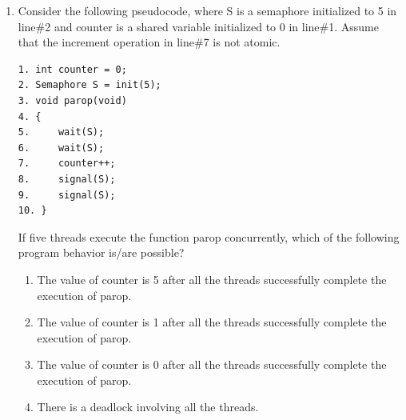 \documentclass[a4paper, 11pt]{article}
\begin{document}
\begin{enumerate}
    \item Consider the following pseudocode, where S is a semaphore initialized to 5 in line\#2 and counter is a shared variable initialized to 0 in line\#1. Assume that the increment operation in line\#7 is not atomic.
    
    \begin{verbatim}
1. int counter = 0;
2. Semaphore S = init(5);
3. void parop(void)
4. {
5.     wait(S);
6.     wait(S);
7.     counter++;
8.     signal(S);
9.     signal(S);
10. }
    \end{verbatim}
    
    If five threads execute the function parop concurrently, which of the following program behavior is/are possible?
    \begin{enumerate}
        \item The value of counter is 5 after all the threads successfully complete the execution of parop.
        \item The value of counter is 1 after all the threads successfully complete the execution of parop.
        \item The value of counter is 0 after all the threads successfully complete the execution of parop.
        \item There is a deadlock involving all the threads.
    \end{enumerate}
    \hfill{}
    

\end{enumerate}
\end{document}
